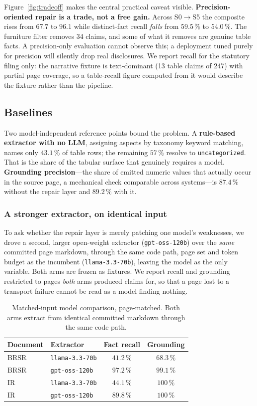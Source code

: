 \documentclass[3p,times]{elsarticle}
\begin{document}
Figure~\ref{fig:tradeoff} makes the central practical caveat visible.
\textbf{Precision-oriented repair is a trade, not a free gain.} Across S0$\to$S5
the composite rises from $67.7$ to $96.1$ while distinct-fact recall
\emph{falls} from $59.5\,\%$ to $54.0\,\%$. The furniture filter removes 34
claims, and some of what it removes are genuine table facts. A precision-only
evaluation cannot observe this; a deployment tuned purely for precision will
silently drop real disclosures. We report recall for the statutory filing only:
the narrative fixture is text-dominant (13 table claims of 247) with partial page
coverage, so a table-recall figure computed from it would describe the fixture
rather than the pipeline.

\subsection{Baselines}

Two model-independent reference points bound the problem. A \textbf{rule-based
extractor with no LLM}, assigning aspects by taxonomy keyword matching, names
only $43.1\,\%$ of table rows; the remaining $57\,\%$ resolve to
\texttt{uncategorized}. That is the share of the tabular surface that genuinely
requires a model. \textbf{Grounding precision}---the share of emitted numeric
values that actually occur in the source page, a mechanical check comparable
across systems---is $87.4\,\%$ without the repair layer and $89.2\,\%$ with it.

\subsubsection*{A stronger extractor, on identical input}

To ask whether the repair layer is merely patching one model's weaknesses, we drove a
second, larger open-weight extractor (\texttt{gpt-oss-120b}) over the \emph{same}
committed page markdown, through the same code path, page set and token budget as the
incumbent (\texttt{llama-3.3-70b}), leaving the model as the only variable. Both arms
are frozen as fixtures. We report recall and grounding restricted to pages
\emph{both} arms produced claims for, so that a page lost to a transport failure
cannot be read as a model finding nothing.

\begin{table}[t]
\centering
\caption{Matched-input model comparison, page-matched. Both arms extract from identical
committed markdown through the same code path.}
\label{tab:models}
\begin{tabular}{llcc}
\toprule
Document & Extractor & Fact recall & Grounding\\
\midrule
BRSR    & \texttt{llama-3.3-70b}  & $41.2\,\%$ & $68.3\,\%$\\
BRSR    & \texttt{gpt-oss-120b}   & $\mathbf{97.2\,\%}$ & $\mathbf{99.1\,\%}$\\
IR      & \texttt{llama-3.3-70b}  & $44.1\,\%$ & $100\,\%$\\
IR      & \texttt{gpt-oss-120b}   & $\mathbf{89.8\,\%}$ & $100\,\%$\\
\bottomrule
\end{tabular}
\end{table}
\end{document}
